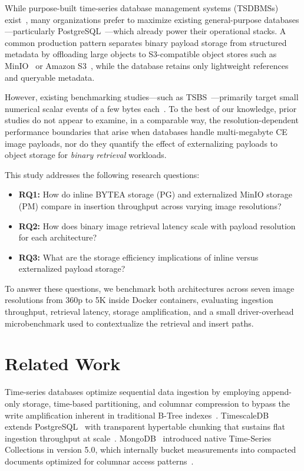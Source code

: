 \documentclass[conference]{IEEEtran}
\begin{document}
While purpose-built time-series database management systems (TSDBMSs) exist~\cite{dewaal_timeseries_survey,tigerdata_tsdb_compare}, many organizations prefer to maximize existing general-purpose databases---particularly PostgreSQL~\cite{postgresql_official}---which already power their operational stacks. A common production pattern separates binary payload storage from structured metadata by offloading large objects to S3-compatible object stores such as MinIO~\cite{minio_official} or Amazon S3~\cite{aws_s3_official}, while the database retains only lightweight references and queryable metadata.

However, existing benchmarking studies---such as TSBS~\cite{tsbs}---primarily target small numerical scalar events of a few bytes each~\cite{tsbs,cratedb_ts_benchmark,diva_timescaledb_mongodb_eval}. To the best of our knowledge, prior studies do not appear to examine, in a comparable way, the resolution-dependent performance boundaries that arise when databases handle multi-megabyte CE image payloads, nor do they quantify the effect of externalizing payloads to object storage for \emph{binary retrieval} workloads.

This study addresses the following research questions:
\begin{itemize}
    \item \textbf{RQ1:} How do inline BYTEA storage (PG) and externalized MinIO storage (PM) compare in insertion throughput across varying image resolutions?
    \item \textbf{RQ2:} How does binary image retrieval latency scale with payload resolution for each architecture?
    \item \textbf{RQ3:} What are the storage efficiency implications of inline versus externalized payload storage?
\end{itemize}

To answer these questions, we benchmark both architectures across seven image resolutions from 360p to 5K inside Docker containers, evaluating ingestion throughput, retrieval latency, storage amplification, and a small driver-overhead microbenchmark used to contextualize the retrieval and insert paths.

\section{Related Work}
\label{sec:related_work}

Time-series databases optimize sequential data ingestion by employing append-only storage, time-based partitioning, and columnar compression to bypass the write amplification inherent in traditional B-Tree indexes~\cite{dewaal_timeseries_survey,jensen_tsms_survey}. TimescaleDB~\cite{timescaledb_official} extends PostgreSQL~\cite{postgresql_official} with transparent hypertable chunking that sustains flat ingestion throughput at scale~\cite{dewaal_timeseries_survey,nerc_tsdb_survey}. MongoDB~\cite{mongodb_official} introduced native Time-Series Collections in version 5.0, which internally bucket measurements into compacted documents optimized for columnar access patterns~\cite{tigerdata_mongodb_timescaledb,maddevs_timescaledb_beats_pg}.
\end{document}

